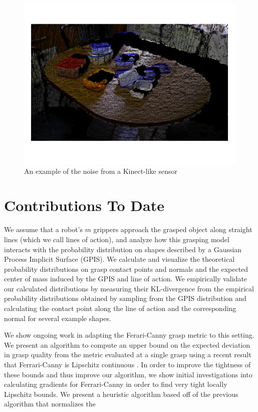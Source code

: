 \documentclass[letterpaper, 10 pt, conference]{ieeeconf}  %
\begin{document}
\begin{figure}[ht!]
\centering
\includegraphics[scale = 0.3]{figures/Slide02.jpg}
\caption{An example of the noise from a Kinect-like sensor}
\vspace*{-10pt}
\label{fig:noisy data}
\end{figure}

\section{Contributions To Date}
We assume that a robot's $m$ grippers approach the grasped object along straight lines (which we call lines of action), and analyze how this grasping model interacts with the probability distribution on shapes described by a Gaussian Process Implicit Surface (GPIS).
We calculate and visualize the theoretical probability distributions on grasp contact points and normals and the expected center of mass induced by the GPIS and line of action.
We empirically validate our calculated distributions by measuring their KL-divergence from the empirical probability distributions obtained by sampling from the GPIS distribution and calculating the contact point along the line of action and the corresponding normal for several example shapes.

We show ongoing work in adapting the Ferari-Canny grasp metric to this setting.
We present an algorithm to compute an upper bound on the expected deviation in grasp quality from the metric evaluated at a single grasp using a recent result that Ferrari-Canny is Lipschitz continuous \cite{pokorny2013classical}.
In order to improve the tightness of these bounds and thus improve our algorithm, we show initial investigations into calculating gradients for Ferrari-Canny in order to find very tight locally Lipschitz bounds.
We present a heuristic algorithm based off of the previous algorithm that normalizes the 
\end{document}
